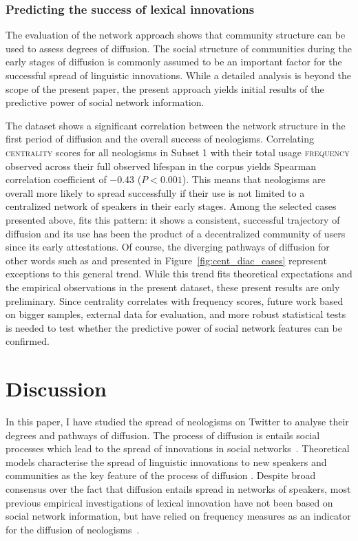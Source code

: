 \documentclass[
  a4paper,
  abstract=on,
  captions=tableabove
  ]{scrartcl}
\begin{document}
    \subsubsection{Predicting the success of lexical innovations}

      The evaluation of the network approach shows that community structure can be used to assess degrees of diffusion. The social structure of communities during the early stages of diffusion is commonly assumed to be an important factor for the successful spread of linguistic innovations. While a detailed analysis is beyond the scope of the present paper, the present approach yields initial results of the predictive power of social network information.

      The dataset shows a significant correlation between the network structure in the first period of diffusion and the overall success of neologisms. Correlating \textsc{centrality} scores for all neologisms in Subset 1 with their total usage \textsc{frequency} observed across their full observed lifespan in the corpus yields Spearman correlation coefficient of \num{-0.43} (${P < 0.001}$). This means that neologisms are overall more likely to spread successfully if their use is not limited to a centralized network of speakers in their early stages. Among the selected cases presented above,  fits this pattern: it shows a consistent, successful trajectory of diffusion and its use has been the product of a decentralized community of users since its early attestations. Of course, the diverging pathways of diffusion for other words such as  and  presented in Figure~\ref{fig:cent_diac_cases} represent exceptions to this general trend. While this trend fits theoretical expectations and the empirical observations in the present dataset, these present results are only preliminary. Since centrality correlates with frequency scores, future work based on bigger samples, external data for evaluation, and more robust statistical tests is needed to test whether the predictive power of social network features can be confirmed.

\section{Discussion}
  \label{sec:discussion}

  In this paper, I have studied the spread of neologisms on Twitter to analyse their degrees and pathways of diffusion. The process of diffusion is entails social processes which lead to the spread of innovations in social networks~\parencite{Rogers1962DiffusionInnovations}. Theoretical models characterise the spread of linguistic innovations to new speakers and communities as the key feature of the process of diffusion \parencite{Weinreich1968EmpiricalFoundations,Schmid2020DynamicsLinguistic}. Despite broad consensus over the fact that diffusion entails spread in networks of speakers, most previous empirical investigations of lexical innovation have not been based on social network information, but have relied on frequency measures as an indicator for the diffusion of neologisms~\parencite{Stefanowitsch2017CorpusbasedPerspective}.
\end{document}
